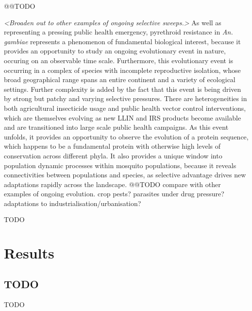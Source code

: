\documentclass[a4paper,11pt,abstracton,hidelinks]{scrartcl}
\begin{document}
@@TODO


\textit{<Broaden out to other examples of ongoing selective sweeps.>}
%
As well as representing a pressing public health emergency, pyrethroid resistance in \textit{An. gambiae} represents a phenomenon of fundamental biological interest, because it provides an opportunity to study an ongoing evolutionary event in nature, occuring on an observable time scale.
%
Furthermore, this evolutionary event is occurring in a complex of species with incomplete reproductive isolation, whose broad geographical range spans an entire continent and a variety of ecological settings.
%
Further complexity is added by the fact that this event is being driven by strong but patchy and varying selective pressures.
%
There are heterogeneities in both agricultural insecticide usage and public health vector control interventions, which are themselves evolving as new LLIN and IRS products become available and are transitioned into large scale public health campaigns.
%
As this event unfolds, it provides an opportunity to observe the evolution of a protein sequence, which happens to be a fundamental protein with otherwise high levels of conservation across different phyla.
%
It also provides a unique window into population dynamic processes within mosquito populations, because it reveals connectivities between populations and species, as selective advantage drives new adaptations rapidly across the landscape.
%
@@TODO compare with other examples of ongoing evolution. crop pests? parasites under drug pressure? adaptations to industrialisation/urbanisation?


TODO


\section*{Results}


\subsection*{TODO}


TODO


\end{document}
